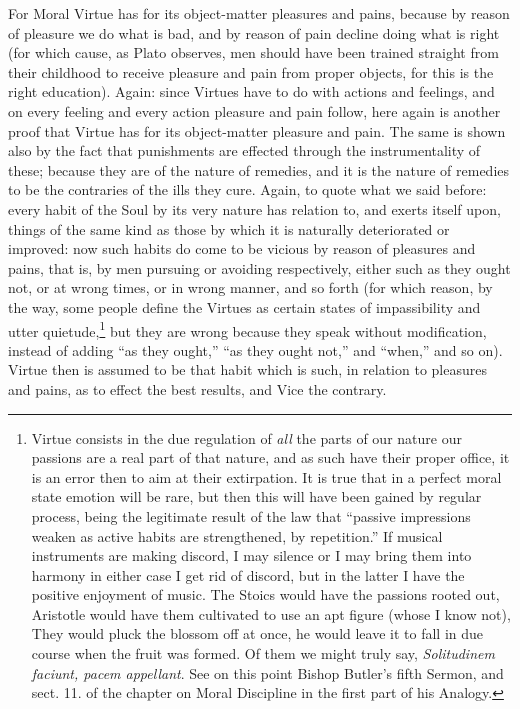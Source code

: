 For Moral Virtue has for its object-matter pleasures and pains, because by
reason of pleasure we do what is bad, and by reason of pain decline doing what
is right (for which cause, as Plato observes, men should have been trained
straight from their childhood to receive pleasure and pain from proper objects,
for this is the right education). Again: since Virtues have to do with actions
and feelings, and on every feeling and every action pleasure and pain follow,
here again is another proof that Virtue has for its object-matter pleasure and
pain. The same is shown also by the fact that punishments are effected through
the instrumentality of these; because they are of the nature of remedies, and
it is the nature of remedies to be the contraries of the ills they cure. Again,
to quote what we said before: every habit of the Soul by its very nature has
relation to, and exerts itself upon, things of the same kind as those by which
it is naturally deteriorated or improved: now such habits do come to be vicious
by reason of pleasures and pains, that is, by men pursuing or avoiding
respectively, either such as they ought not, or at wrong times, or in wrong
manner, and so forth (for which reason, by the way, some people define the
Virtues as certain states of impassibility and utter quietude,\footnote{Virtue consists in the due regulation of \emph{all} the parts of our nature our
passions are a real part of that nature, and as such have their proper office,
it is an error then to aim at their extirpation. It is true that in a perfect
moral state emotion will be rare, but then this will have been gained by
regular process, being the legitimate result of the law that “passive
impressions weaken as active habits are strengthened, by repetition.” If
musical instruments are making discord, I may silence or I may bring them into
harmony in either case I get rid of discord, but in the latter I have the
positive enjoyment of music. The Stoics would have the passions rooted out,
Aristotle would have them cultivated to use an apt figure (whose I know not),
They would pluck the blossom off at once, he would leave it to fall in due
course when the fruit was formed. Of them we might truly say, \emph{Solitudinem
faciunt, pacem appellant}. See on this point Bishop Butler’s fifth
Sermon, and sect. 11. of the chapter on Moral Discipline in the first part of
his Analogy.}
but they are wrong because they speak without modification, instead of adding
“as they ought,” “as they ought not,” and
“when,” and so on). Virtue then is assumed to be that habit which
is such, in relation to pleasures and pains, as to effect the best results, and
Vice the contrary.

